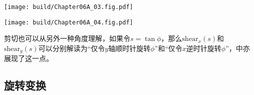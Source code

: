 \begin{Figure}[剪切变换]
    \begin{FigureSub}[沿$x$方向的剪切]
        \texttt{[image: build/Chapter06A\_03.fig.pdf]}
    \end{FigureSub}
    \hspace{1cm}
    \begin{FigureSub}[沿$y$方向的剪切]
        \texttt{[image: build/Chapter06A\_04.fig.pdf]}
    \end{FigureSub}
\end{Figure}

剪切也可以从另外一种角度理解，如果令$s=\tan\phi$，那么$\mathrm{shear}_x(s)$和$\mathrm{shear}_y(s)$可以分别解读为“仅令$y$轴顺时针旋转$\phi$”和“仅令$x$逆时针旋转$\phi$”，中亦展现了这一点。

\subsection{旋转变换}

